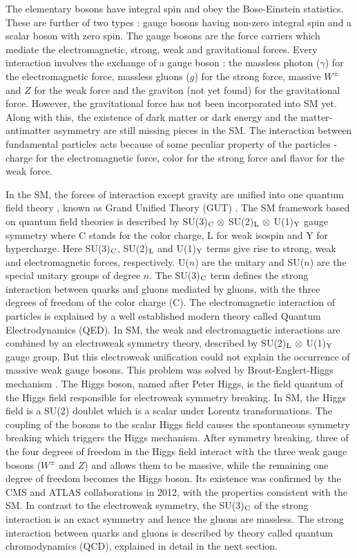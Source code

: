 The elementary bosons have integral spin and obey the Bose-Einstein statistics. These are further of two types : gauge bosons having non-zero integral spin and a scalar boson with zero spin. The gauge bosons are the force carriers which mediate the electromagnetic, strong, weak and gravitational forces. Every interaction involves the exchange of a gauge boson : the massless photon ($\gamma$) for the electromagnetic force, massless gluons ($g$) for the strong force, massive $W^\pm$ and $Z$ for the weak force and the graviton (not yet found) for the gravitational force. However, the gravitational force has not been incorporated into SM yet. Along with this, the existence of dark matter or dark energy and the matter-antimatter asymmetry are still missing pieces in the SM. The interaction between fundamental particles acts because of some peculiar property of the particles - charge for the electromagnetic force, color for the strong force and flavor for the weak force. 

In the SM, the forces of interaction except gravity are unified into one quantum field theory \cite{Peskin:1995ev}, known as Grand Unified Theory (GUT) \cite{Glashow:1979pj,Salam:1980jd,Georgi:1974sy}. The SM framework based on quantum field theories is described by SU(3)$_{\rm C}~\otimes$ SU(2)$_{\rm L}~\otimes$ U(1)$_{\rm Y}$ gauge symmetry where C stands for the color charge, L for weak isospin and Y for hypercharge. Here SU(3)$_{\rm C}$, SU(2)$_{\rm L}$ and U(1)$_{\rm Y}$ terms give rise to strong, weak and electromagnetic forces, respectively. U($n$) are the unitary and SU($n$) are the special unitary groups of degree $n$. The SU(3)$_{\rm C}$ term defines the strong interaction between quarks and gluons mediated by gluons, with the three degrees of freedom of the color charge (C). The electromagnetic interaction of particles is explained by a well established modern theory called Quantum Electrodynamics (QED). In SM, the weak and electromagnetic interactions are combined by an electroweak symmetry theory, described by SU(2)$_{\rm L}~\otimes$ U(1)$_{\rm Y}$ gauge group. But this electroweak unification could not explain the occurrence of massive weak gauge bosons. This problem was solved by Brout-Englert-Higgs mechanism \cite{Higgs:1964pj,Englert:1964et}. The Higgs boson, named after Peter Higgs, is the field quantum of the Higgs field responsible for electroweak symmetry breaking. In SM, the Higgs field is a SU(2) doublet which is a scalar under Lorentz transformations. The coupling of the bosons to the scalar Higgs field causes the spontaneous symmetry breaking which triggers the Higgs mechanism. After symmetry breaking, three of the four degrees of freedom in the Higgs field interact with the three weak gauge bosons ($W^\pm$ and $Z$) and allows them to be massive, while the remaining one degree of freedom becomes the Higgs boson. Its existence was confirmed by the CMS \cite{Chatrchyan:2012xdj} and ATLAS \cite{Aad:2012tfa} collaborations in 2012, with the properties consistent with the SM. In contrast to the electroweak symmetry, the SU(3)$_{\rm C}$ of the strong interaction is an exact symmetry and hence the gluons are massless. The strong interaction between quarks and gluons is described by theory called quantum chromodynamics (QCD), explained in detail in the next section.

